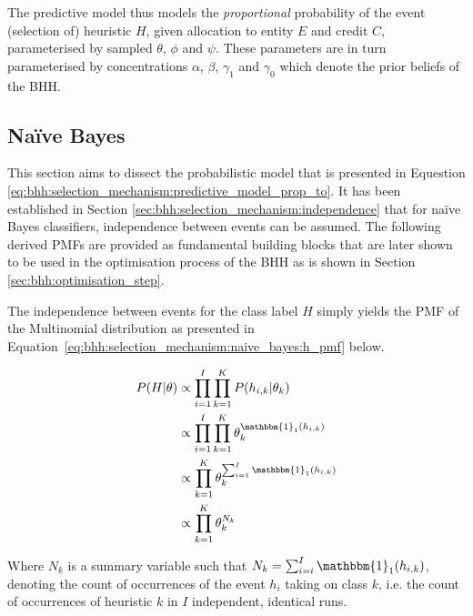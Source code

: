 The predictive model thus models the \textit{proportional} probability of the event (selection of) heuristic $H$, given allocation to entity $E$ and credit $C$, parameterised by sampled $\theta$, $\phi$ and $\psi$. These parameters are in turn parameterised by concentrations $\alpha$, $\beta$, $\gamma_{1}$ and $\gamma_{0}$ which denote the prior beliefs of the \ac{BHH}.


\subsection{Naïve Bayes}
\label{sec:bhh:selection_mechanism:naive_bayes}

This section aims to dissect the probabilistic model that is presented in Equestion \ref{eq:bhh:selection_mechanism:predictive_model_prop_to}. It has been established in Section \ref{sec:bhh:selection_mechanism:independence} that for  naïve Bayes classifiers, independence between events can be assumed. The following derived \acp{PMF} are provided as fundamental building blocks that are later shown to be used in the optimisation process of the \ac{BHH} as is shown in Section \ref{sec:bhh:optimisation_step}.

The independence between events for the class label $H$ simply yields the \ac{PMF} of the Multinomial distribution as presented in Equation~\eqref{eq:bhh:selection_mechanism:naive_bayes:h_pmf} below.

\begin{equation}
      \label{eq:bhh:selection_mechanism:naive_bayes:h_pmf}
      \begin{split}
            P(H \vert \theta)
            &\propto \prod_{i=1}^{I} \prod_{k=1}^{K} P(h_{i,k} \vert \theta_{k}) \\
            &\propto \prod_{i=1}^{I} \prod_{k=1}^{K} \theta_{k}^{\mathbbm{1}_{1}(h_{i,k})} \\
            &\propto \prod_{k=1}^{K} \theta_{k}^{\sum_{i=1}^{I} \mathbbm{1}_{1}(h_{i,k})} \\
            &\propto \prod_{k=1}^{K} \theta_{k}^{N_{k}}
      \end{split}
\end{equation}

Where $N_{k}$ is a summary variable such that $N_{k} = \sum_{i=i}^{I}
      \mathbbm{1}_{1}(h_{i,k})$, denoting the count of occurrences of the event
$h_{i}$ taking on class $k$, i.e. the count of occurrences of heuristic $k$ in
$I$ independent, identical runs.

